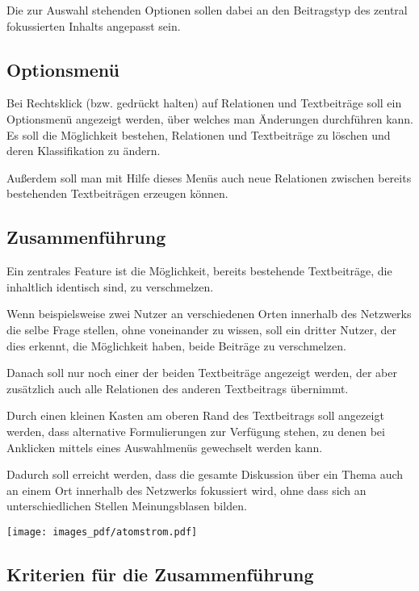 \documentclass{article}
\begin{document}
	\bigskip
	Die zur Auswahl stehenden Optionen sollen dabei an den Beitragstyp des zentral fokussierten Inhalts angepasst sein.
	
	
	\subsection{Optionsmenü}
	
	Bei Rechtsklick (bzw. gedrückt halten) auf Relationen und Textbeiträge soll ein Optionsmenü angezeigt werden, über welches man Änderungen durchführen kann. Es soll die Möglichkeit bestehen, Relationen und Textbeiträge zu löschen und deren Klassifikation zu ändern.
	
	\bigskip
	Außerdem soll man mit Hilfe dieses Menüs auch neue Relationen zwischen bereits bestehenden Textbeiträgen erzeugen können.
	
	\subsection{Zusammenführung}
	
	Ein zentrales Feature ist die Möglichkeit, bereits bestehende Textbeiträge, die inhaltlich identisch sind, zu verschmelzen.
	
	\bigskip
	Wenn beispielsweise zwei Nutzer an verschiedenen Orten innerhalb des Netzwerks die selbe Frage stellen, ohne voneinander zu wissen, soll ein dritter Nutzer, der dies erkennt, die Möglichkeit haben, beide Beiträge zu verschmelzen.
	
	\bigskip
	Danach soll nur noch einer der beiden Textbeiträge angezeigt werden, der aber zusätzlich auch alle Relationen des anderen Textbeitrags übernimmt.
	
	\bigskip
	Durch einen kleinen Kasten am oberen Rand des Textbeitrags soll angezeigt werden, dass alternative Formulierungen zur Verfügung stehen, zu denen bei Anklicken mittels eines Auswahlmenüs gewechselt werden kann.
	
	\bigskip
	Dadurch soll erreicht werden, dass die gesamte Diskussion über ein Thema auch an einem Ort innerhalb des Netzwerks fokussiert wird, ohne dass sich an unterschiedlichen Stellen Meinungsblasen bilden.
	
	\bigskip
	\texttt{[image: images\_pdf/atomstrom.pdf]}
	
	\subsection{Kriterien für die Zusammenführung}
	
\end{document}
